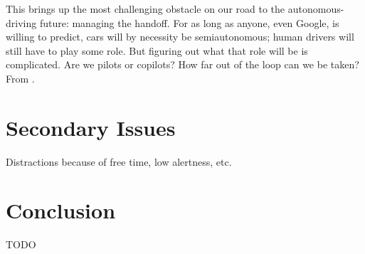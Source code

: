 \documentclass{acm_proc_article-sp}
\begin{document}
This brings up the most challenging obstacle on our road to the autonomous- driving future: managing the handoff.
For as long as anyone, even Google, is willing to predict, cars will by necessity be semiautonomous; human drivers will still have to play some role.
But figuring out what that role will be is complicated.
Are we pilots or copilots? How far out of the loop can we be taken?
From \cite{www:wired}.

\section{Secondary Issues}

Distractions because of free time, low alertness, etc.

\section{Conclusion}

TODO


  

\balancecolumns
\end{document}
